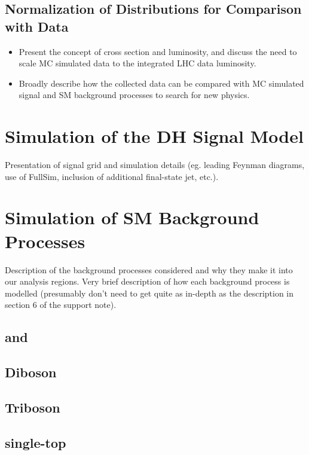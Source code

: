 \subsection{Normalization of Distributions for Comparison with Data}

\begin{itemize}
\item Present the concept of cross section and luminosity, and discuss the need to scale MC simulated data to the integrated LHC data luminosity. 
\item Broadly describe how the collected data can be compared with MC simulated signal and SM background processes to search for new physics.
\end{itemize}

\section{Simulation of the DH Signal Model}
\label{sec:DH_model_sim}

Presentation of signal grid and simulation details (eg. leading Feynman diagrams, use of FullSim, inclusion of additional final-state jet, etc.).

\section{Simulation of SM Background Processes}
\label{sec:SM_bkg_sim}

Description of the background processes considered and why they make it into our analysis regions. Very brief description of how each background process is modelled (presumably don't need to get quite as in-depth as the description in section 6 of the support note). 

\subsection{\wjets and \zjets}

\subsection{\ttbar}

\subsection{Diboson}

\subsection{Triboson}

\subsection{single-top}


